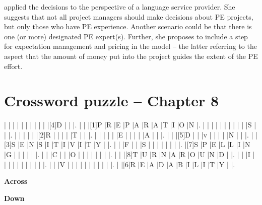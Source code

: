 \citet{hor_chancen_2020} applied the decisions to the perspective of a language service pro\-vid\-er. She suggests that not all project managers should make decisions about PE projects, but only those who have PE experience. Another scenario could be that there is one (or more) designated PE expert(s). Further, she proposes to include a step for expectation management and pricing in the model -- the latter referring to the aspect that the amount of money put into the project guides the extent of the PE effort.

\newpage

\section*{Crossword puzzle -- Chapter 8}

\begin{Puzzle}{13}{14}
|{}	|{}	|{}	|{}	|{}	|{}	|{}	|{}	|{}	|{}	|[4]D	|{}	|{}	|.
|{}	|{}	|[1]P	|R	|E	|P	|A	|R	|A	|T	|I	|O	|N	|.
|{}	|{}	|{}	|{}	|{}	|{}	|{}	|{}	|{}	|{}	|S	|{}	|{}	|.
|{}	|{}	|{}	|{}	|{}	|[2]R	|{}	|{}	|{}	|{}	|T	|{}	|{}	|.
|{}	|{}	|{}	|{}	|{}	|E	|{}	|{}	|{}	|{}	|A	|{}	|{}	|.
|{}	|{}	|[5]D	|{}	|{}	|v	|{}	|{}	|{}	|{}	|N	|{}	|{}	|.
|{}	|[3]S	|E	|N	|S	|I	|T	|I	|V	|I	|T	|Y	|{}	|.
|{}	|{}	|F	|{}	|{}	|S	|{}	|{}	|{}	|{}	|{}	|{}	|{}	|.
|[7]S	|P	|E	|L	|L	|I	|N	|G	|{}	|{}	|{}	|{}	|{}	|.
|{}	|{}	|C	|{}	|{}	|O	|{}	|{}	|{}	|{}	|{}	|{}	|{}	|.
|{}	|{}	|[8]T	|U	|R	|N	|A	|R	|O	|U	|N	|D	|{}	|.
|{}	|{}	|I	|{}	|{}	|{}	|{}	|{}	|{}	|{}	|{}	|{}	|{}	|.
|{}	|{}	|V	|{}	|{}	|{}	|{}	|{}	|{}	|{}	|{}	|{}	|{}	|.
|{}	|[6]R	|E	|A	|D	|A	|B	|I	|L	|I	|T	|Y	|{}	|.
\end{Puzzle}

\begin{PuzzleClues}{\textbf{Across}}
\end{PuzzleClues}

\begin{PuzzleClues}{\textbf{Down}}
\end{PuzzleClues}
